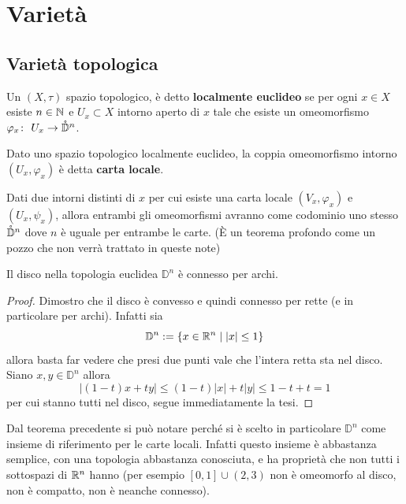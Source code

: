 \chapter{Varietà}


\section{Varietà topologica}

\begin{definition}
	Un $(X,\tau)$ spazio topologico, è detto \textbf{localmente euclideo} se per ogni $x \in X$ esiste $n \in \mathbb{N}$ e $U_x \subset X$ intorno aperto di $x$ tale che esiste un omeomorfismo $\varphi_x \colon\ U_x \rightarrow \mathring{\mathbb{D}}^n$.  
\end{definition}

\begin{definition}
	Dato uno spazio topologico localmente euclideo, la coppia omeomorfismo intorno $(U_x, \varphi_x)$ è detta \textbf{carta locale}.
\end{definition}

\begin{remark}
	Dati due intorni distinti di $x$ per cui esiste una carta locale $(V_x, \varphi_x)$ e $(U_x, \psi_x)$, allora entrambi gli omeomorfismi avranno come codominio uno stesso $\mathring{\mathbb{D}}^n$ dove $n$ è uguale per entrambe le carte. (È un teorema profondo come un pozzo che non verrà trattato in queste note)
\end{remark}

\begin{theorem}
	Il disco nella topologia euclidea $\mathbb{D}^n$ è connesso per archi. 
\end{theorem} 
\begin{proof}
	Dimostro che il disco è convesso e quindi connesso per rette (e in particolare per archi). Infatti sia 
	\begin{equation}
	\mathbb{D}^n := \{x\in \mathbb{R}^n\; |\; |x| \le 1\}
	\end{equation}
	allora basta far vedere che presi due punti vale che l'intera retta sta nel disco. Siano $x, y \in \mathbb{D}^n$ allora
	\begin{equation}
	|(1-t)x+ty| \le (1-t)|x| + t|y| \le 1-t+t =1
	\end{equation}
	per cui stanno tutti nel disco, segue immediatamente la tesi. 
\end{proof}

\begin{remark}
	Dal teorema precedente si può notare perché si è scelto in particolare $\mathbb{D}^n$ come insieme di riferimento per le carte locali. Infatti questo insieme è abbastanza semplice, con una topologia abbastanza conosciuta, e ha proprietà che non tutti i sottospazi di $\mathbb{R}^n$ hanno (per esempio $\left[0,1\right] \cup (2,3)$ non è omeomorfo al disco, non è compatto, non è neanche connesso).
\end{remark}

